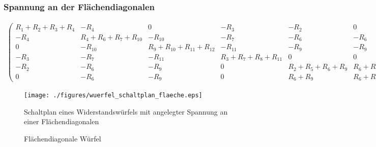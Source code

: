 \documentclass[10pt,a4paper]{article}
\begin{document}
\begin{landscape}
\subsubsection{Spannung an der Flächendiagonalen}
\begin{align}
\begin{pmatrix}
R_1+R_2+R_3+R_4 &  -R_4  &  0  &  -R_3  &  -R_2  &  0  \\ 
-R_4 & R_4+R_6+R_7+R_{10} & -R_{10} & -R_7 & -R_6 & -R_6 \\ 
 0  & -R_{10} & R_9+R_{10}+R_{11}+R_{12} & -R_{11} & -R_9 & -R_9 \\ 
-R_3 & -R_7 & -R_11 & R_3+R_7+R_8+R_{11} & 0 & 0 \\ 
-R_2 & -R_6 & -R_9 & 0 & R_2+R_5+R_6+R_9 & R_6+R_9 \\ 
 0  & -R_6 & -R_9 &  0  & R_6+R_9 & R_6+R_9
\end{pmatrix}
\begin{pmatrix}
I_1\\I_2\\I_3\\I_4\\I_5\\I_{ges}
\end{pmatrix}
=
\begin{pmatrix}
0\\0\\0\\0\\0\\U
\end{pmatrix}
\label{eqn:wuerfel_flaeche}
\end{align}
\thispagestyle{empty}

\begin{figure}[htbp!]
\centering
\texttt{[image: ./figures/wuerfel\_schaltplan\_flaeche.eps]}
\caption{Schaltplan eines Widerstandswürfels mit angelegter Spannung an einer Flächendiagonalen}
\label{fig:wuerfel_schaltplan_flaeche}
\end{figure}
\end{landscape}
\begin{figure}[htbp!]
\centering

\caption{Flächendiagonale Würfel}
\end{figure}
\thispagestyle{empty}
\newpage
\end{document}
